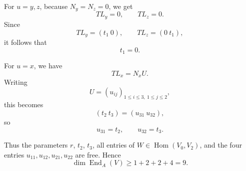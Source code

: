 \documentclass[11pt]{article}
\DeclareMathOperator{\End}{End}
\DeclareMathOperator{\Hom}{Hom}
\theoremstyle{plain}
\theoremstyle{remark}
\begin{document}
	For \(u=y,z\), because \(N_y=N_z=0\), we get
	\[
	TL_y=0,\qquad TL_z=0.
	\]
	Since
	\[
	TL_y=(t_1\ 0),\qquad TL_z=(0\ t_1),
	\]
	it follows that
	\[
	t_1=0.
	\]
	
	For \(u=x\), we have
	\[
	TL_x=N_xU.
	\]
	Writing
	\[
	U=(u_{ij})_{1\le i\le 3,\ 1\le j\le 2},
	\]
	this becomes
	\[
	(t_2\ t_3)=(u_{31}\ u_{32}),
	\]
	so
	\[
	u_{31}=t_2,\qquad u_{32}=t_3.
	\]
	
	Thus the parameters \(r\), \(t_2\), \(t_3\), all entries of \(W\in \Hom(V_0,V_2)\),
	and the four entries \(u_{11},u_{12},u_{21},u_{22}\) are free. Hence
	\[
	\dim \End_A(V)\ge 1+2+2+4=9.
	\]




\end{document}
